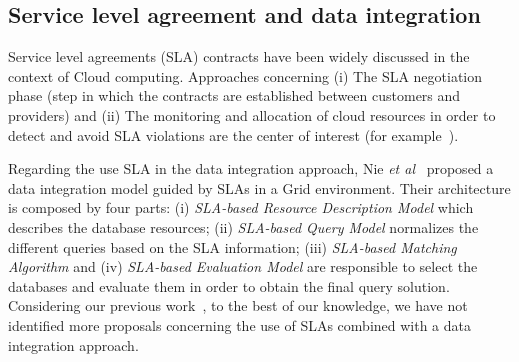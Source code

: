 \subsection{Service level agreement and data integration}
Service level agreements (SLA) contracts have been widely discussed in the context of Cloud computing.
Approaches concerning (i) The SLA negotiation phase (step in which the contracts are established between customers and providers) and (ii) The monitoring and allocation of cloud resources in order to detect and avoid SLA violations are the center of interest (for example~\cite{SonJ13,Maity14,Wu13,Chen13}). 

Regarding the use SLA in the data integration approach, Nie \textit{et al}~\cite{Nie07} proposed a data integration model guided by SLAs in a Grid environment. 
Their architecture is composed by four parts: (i) \textit{SLA-based Resource Description Model} which describes the database resources; (ii) \textit{SLA-based Query Model} normalizes the different queries based on the SLA information; (iii) \textit{SLA-based Matching Algorithm} and (iv) \textit{SLA-based Evaluation Model} are responsible to select the databases and evaluate them in order to obtain the final query solution.  
Considering our previous work~\cite{012}, to the best of our knowledge, we have not identified more proposals concerning the use of SLAs combined with a data integration approach.
